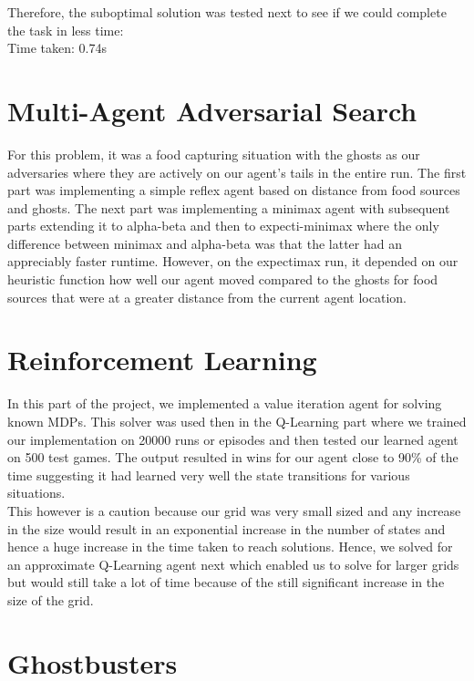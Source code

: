 Therefore, the suboptimal solution was tested next to see if we could complete the task in less time: \\
Time taken: 0.74s

\section{Multi-Agent Adversarial Search}
For this problem, it was a food capturing situation with the ghosts as our adversaries where they are actively on our agent's tails in the entire run.  The first part was implementing a simple reflex agent based on distance from food sources and ghosts. 
The next part was implementing a minimax agent with subsequent parts extending it to alpha-beta and then to expecti-minimax\cite{russell2003artificial} where the only difference between minimax and alpha-beta was that the latter had an appreciably faster runtime. However, on the expectimax run, it depended on our heuristic function how well our agent moved compared to the ghosts for food sources that were at a greater distance from the current agent location.

\section{Reinforcement Learning}
In this part of the project, we implemented a value iteration agent for solving known MDPs. This solver was used then in the Q-Learning part where we trained our implementation on 20000 runs or episodes and then tested our learned agent on 500 test games. The output resulted in wins for our agent close to 90\% of the time suggesting it had learned very well the state transitions for various situations.\\
This however is a caution because our grid was very small sized and any increase in the size would result in an exponential increase in the number of states and hence a huge increase in the time taken to reach solutions. Hence, we solved for an approximate Q-Learning agent next which enabled us to solve for larger grids but would still take a lot of time because of the still significant increase in the size of the grid.

\section{Ghostbusters}

